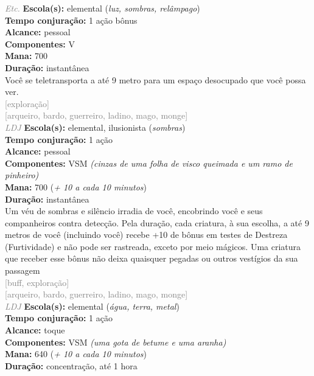 \documentclass{RPG_Adventure}[2021/10/20]
\begin{document}
{\tiny \textcolor{gray}{\textit{Etc.}}}
{\small \t \textbf{Escola(s):} elemental (\textit{luz, sombras, relâmpago})\\\t \textbf{Tempo conjuração:} 1 ação bônus\\\t \textbf{Alcance:} pessoal\\\t \textbf{Componentes:} V\\\t \textbf{Mana:} 700\\\t \textbf{Duração:} instantânea\\}
{\normalsize Você se teletransporta a até 9 metro para um espaço desocupado que você possa ver.\\}
{\scriptsize \textcolor{gray}{[exploração]\\}}
{\scriptsize \textcolor{gray}{[arqueiro, bardo, guerreiro, ladino, mago, monge]\\}}
{\tiny \textcolor{gray}{\textit{LDJ}}}
{\small \t \textbf{Escola(s):} elemental, ilusionista (\textit{sombras})\\\t \textbf{Tempo conjuração:} 1 ação\\\t \textbf{Alcance:} pessoal\\\t \textbf{Componentes:} VSM \textit{(cinzas de uma folha de visco queimada e um ramo de pinheiro)}\\\t \textbf{Mana:} 700 (\textit{+ 10 a cada 10 minutos})\\\t \textbf{Duração:} instantânea\\}
{\normalsize Um véu de sombras e silêncio irradia de você, encobrindo você e seus companheiros contra detecção. Pela duração, cada criatura, à sua escolha, a até 9 metros de você (incluindo você) recebe +10 de bônus em testes de Destreza (Furtividade) e não pode ser rastreada, exceto por meio mágicos. Uma criatura que receber esse bônus não deixa quaisquer pegadas ou outros vestígios da sua passagem\\}
{\scriptsize \textcolor{gray}{[buff, exploração]\\}}
{\scriptsize \textcolor{gray}{[arqueiro, bardo, guerreiro, ladino, mago, monge]\\}}
{\tiny \textcolor{gray}{\textit{LDJ}}}
{\small \t \textbf{Escola(s):} elemental (\textit{água, terra, metal})\\\t \textbf{Tempo conjuração:} 1 ação\\\t \textbf{Alcance:} toque\\\t \textbf{Componentes:} VSM \textit{(uma gota de betume e uma aranha)}\\\t \textbf{Mana:} 640 (\textit{+ 10 a cada 10 minutos})\\\t \textbf{Duração:} concentração, até 1 hora\\}
\end{document}
